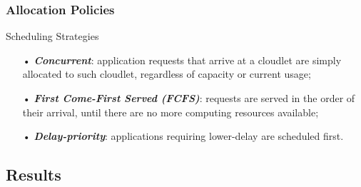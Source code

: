 \documentclass[10pt, pdf, xcolor=pdftex, dvipsnames, table]{beamer}
\begin{document}
\begin{frame}
	\tableofcontents[currentsection]
\end{frame}

\begin{frame}
	\frametitle{Allocation Policies}
 	\begin{block}{Scheduling Strategies}
 		\begin{itemize}
 		    \item[•] \textbf{\textit{Concurrent}}: application requests that arrive at a cloudlet are simply allocated to such cloudlet, regardless of capacity or current usage;\newline
 		    \item[•] \textbf{\textit{First Come-First Served (FCFS)}}: requests are served in the order of their arrival, until there are no more computing resources available;\newline
 		    \item[•] \textbf{\textit{Delay-priority}}: applications requiring lower-delay are scheduled first.
 		\end{itemize}
 	\end{block}
\end{frame}

\subsection[Results]{Results}
\end{document}

